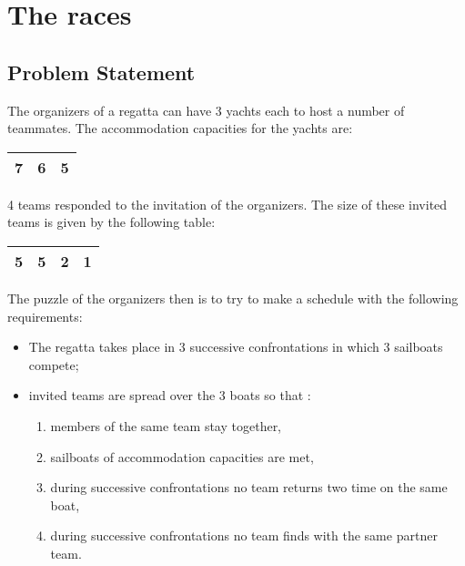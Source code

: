 
\chapter{The races}


\section{Problem Statement}
\label{sec:enonce-probleme}


The organizers of a regatta can have 3 yachts each to host a number of teammates. The  accommodation capacities for the yachts are:
\begin{center}
    \begin{tabular}{|c|c|c|}
        \hline
	7&6&5\\
        \hline
    \end{tabular}
\end{center}



4 teams responded to the invitation of the organizers. The size of these
invited teams is given by the following table:

\begin{center}
    \begin{tabular}{|c|c|c|c|}
        \hline
	5&5&2&1\\
        \hline
    \end{tabular}
\end{center}


The puzzle of the organizers then is to try to make a schedule
with the following requirements:

\begin{itemize}

\item The regatta takes place in 3 successive confrontations in which
       3 sailboats compete;

\item invited teams are spread over the 3 boats so
       that :

    \begin{enumerate}

    \item members of the same team stay together,
    \item sailboats of accommodation capacities are met,
    \item during successive confrontations no team returns two time on the same boat,
    \item during successive confrontations no team finds
           with the same partner team.
    \end{enumerate}

\end{itemize}

